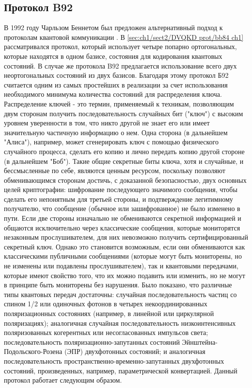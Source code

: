 \subsection{Протокол B92}\label{sec:ch1/sect2/DVQKD prot/b92 ch1}
В 1992 году Чарльзом Беннетом был предложен альтернативный подход к протоколам квантовой коммуникации \cite{bennett1992}. В \ref{sec:ch1/sect2/DVQKD prot/bb84 ch1} рассматривался протокол, который использует четыре попарно ортогональных, которые находятся в одном базисе, состояния  для кодирования квантовых состояний. В случае же протокола B92 предлагается использование всего двух неортогональных состояний из двух базисов. Благодаря этому протокол Б92 считается одним из самых простейших в реализации за счет использования необходимого  минимума количества состояний для распределения ключа.
\newline Распределение ключей - это термин, применяемый к техникам, позволяющим двум сторонам получить последовательность случайных бит ("ключ") с высоким уровнем уверенности в том, что никто другой не знает его или имеет значительную частичную информацию о нем. Одна сторона (в дальнейшем "Алиса"), например, может сгенерировать ключ с помощью физического случайного процесса, сделать его копию и лично передать копию другой стороне (в дальнейшем "Боб"). Такие общие секретные биты ключа, хотя и случайные, и бессмысленные по себе, являются ценным ресурсом, поскольку позволяют обменивающимся сторонам достичь, с доказанной безопасностью, двух основных целей криптографии: шифрование последующего значимого сообщения, чтобы сделать его непонятным для третьей стороны, и подтверждение легитимному получателю, что сообщение (обычное или зашифрованное) не было изменено в пути.
\newline Если две стороны изначально не обмениваются секретной информацией и общаются исключительно через классические сообщения, которые мониторятся незаконным прослушивателем, для них невозможно получить сертифицированный секретный ключ. Однако это становится возможным, если они обмениваются как классическими публичными сообщениями (которые могут быть мониторены, но не изменены или подавлены прослушивателем), так и квантовыми передачами, которые имеют свойство того, что их можно подавить или изменить, но не могут в принципе быть мониторены без нарушения. Было показано, что различные типы квантовых передач достаточны: случайная последовательность частиц со спином 1/2 или одиночных фотонов в четырех некоординированных поляризационных состояниях (например, в линейной или циркулярной поляризациях); аналогичная случайная последовательность низкоинтенсивных поляризованных когерентных или несогласованных импульсов света; последовательность поляризационно-запутанных состояний Эйнштейна-Подольского-Розена (ЭПР) двухфотонных состояний; и аналогичная последовательность пространственно-временно-запутанных двухфотонных состояний, произведенных, например, параметрической конвертацией. Данный протокол работает следующим образом. 
